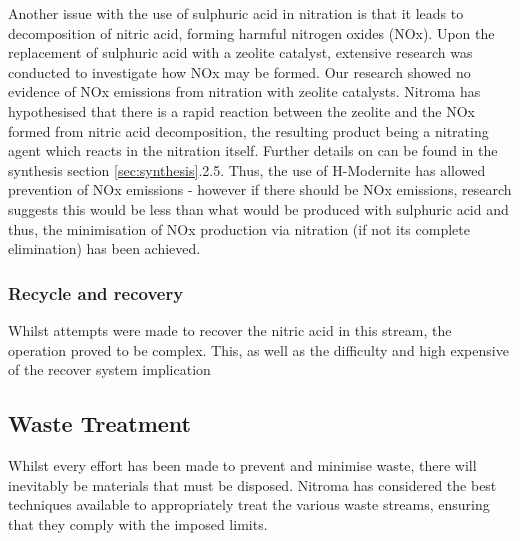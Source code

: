 Another issue with the use of sulphuric acid in nitration is that it leads to decomposition of nitric acid, forming harmful nitrogen oxides (NOx). Upon the replacement of sulphuric acid with a zeolite catalyst, extensive research was conducted to investigate how NOx may be formed. Our research showed no evidence of NOx emissions from nitration with zeolite catalysts. Nitroma has hypothesised that there is a rapid reaction between the zeolite and the NOx formed from nitric acid decomposition, the resulting product being a nitrating agent which reacts in the nitration itself. Further details on can be found in the synthesis section \ref{sec:synthesis}.2.5. Thus, the use of H-Modernite has allowed prevention of NOx emissions - however if there should be NOx emissions, research suggests this would be less than what would be produced with sulphuric acid and thus, the minimisation of NOx production via nitration (if not its complete elimination) has been achieved.  

\subsubsection{Recycle and recovery}


 


Whilst attempts were made to recover the nitric acid in this stream, the operation proved to be complex. This, as well as the difficulty and high expensive of the recover system implication 

\subsection{Waste Treatment}

Whilst every effort has been made to prevent and minimise waste, there will inevitably be materials that must be disposed. Nitroma has considered the best techniques available to appropriately treat the various waste streams, ensuring that they comply with the imposed limits. 

